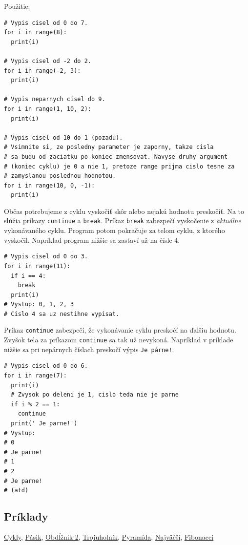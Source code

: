 \documentclass{article}
\begin{document}
Použitie:
\begin{lstlisting}
# Vypis cisel od 0 do 7.
for i in range(8):
  print(i)

# Vypis cisel od -2 do 2.
for i in range(-2, 3):
  print(i)

# Vypis neparnych cisel do 9.
for i in range(1, 10, 2):
  print(i)

# Vypis cisel od 10 do 1 (pozadu).
# Vsimnite si, ze posledny parameter je zaporny, takze cisla
# sa budu od zaciatku po koniec zmensovat. Navyse druhy argument
# (koniec cyklu) je 0 a nie 1, pretoze range prijma cislo tesne za
# zamyslanou poslednou hodnotou.
for i in range(10, 0, -1):
  print(i)
\end{lstlisting}

Občas potrebujeme z cyklu vyskočiť skôr alebo nejakú hodnotu preskočiť. Na to slúžia príkazy \texttt{continue} a \texttt{break}. Príkaz \texttt{break} zabezpečí vyskočenie z \textit{aktuálne} vykonávaného cyklu. Program potom pokračuje za telom cyklu, z ktorého vyskočil. Napríklad program nižšie sa zastaví už na čísle $4$.
\begin{lstlisting}
# Vypis cisel od 0 do 3.
for i in range(11):
  if i == 4:
    break
  print(i)
# Vystup: 0, 1, 2, 3
# Cislo 4 sa uz nestihne vypisat.
\end{lstlisting}

Príkaz \texttt{continue} zabezpečí, že vykonávanie cyklu preskočí na ďalšiu hodnotu. Zvyšok tela za príkazom \texttt{continue} sa tak už nevykoná. Napríklad v príklade nižšie sa pri nepárnych číslach preskočí výpis 
\texttt{Je párne!}.
\begin{lstlisting}
# Vypis cisel od 0 do 6.
for i in range(7):
  print(i)
  # Zvysok po deleni je 1, cislo teda nie je parne
  if i % 2 == 1:
    continue
  print(' Je parne!')
# Vystup:
# 0 
# Je parne!
# 1
# 2
# Je parne!
# (atd)
\end{lstlisting}

\subsection{Príklady}
\href{https://testovac.ksp.sk/tasks/ls-uvod-cykly/}{Cykly},
\href{https://testovac.ksp.sk/tasks/ls-uvod-pasik/}{Pásik},
\href{https://testovac.ksp.sk/tasks/ls-uvod-obdlznik2/}{Obdĺžnik 2},
\href{https://testovac.ksp.sk/tasks/ls-uvod-trojuholnik/}{Trojuholník},
\href{https://testovac.ksp.sk/tasks/ls-uvod-pyramida/}{Pyramída},
\href{https://testovac.ksp.sk/tasks/ls-uvod-najvacsi/}{Najväčší},
\href{https://testovac.ksp.sk/tasks/ls-uvod-fibonacci/}{Fibonacci}
\end{document}
